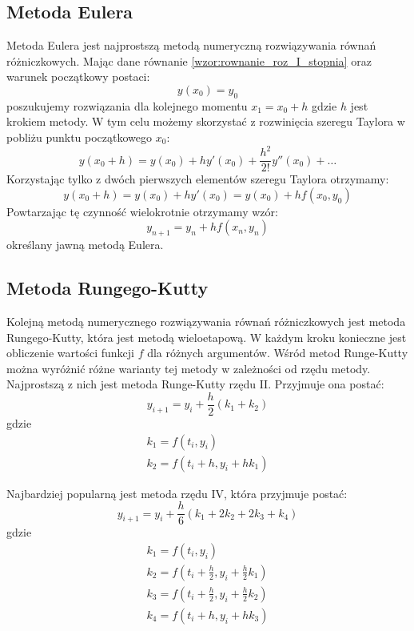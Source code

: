 \subsection*{Metoda Eulera}
Metoda Eulera jest najprostszą metodą numeryczną rozwiązywania równań różniczkowych. Mając dane równanie \ref{wzor:rownanie_roz_I_stopnia} oraz warunek początkowy postaci:
\begin{equation}
	y(x_0) = y_0	
\end{equation}
poszukujemy rozwiązania dla kolejnego momentu $x_1 = x_0 + h$ gdzie $h$ jest krokiem metody. W tym celu możemy skorzystać z rozwinięcia szeregu Taylora w pobliżu punktu początkowego $x_0$:
\begin{equation}
	y(x_0 + h) = y(x_0) + hy'(x_0) + \frac{h^2}{2!}y''(x_0) + \hdots
\end{equation}
Korzystając tylko z dwóch pierwszych elementów szeregu Taylora otrzymamy:
\begin{equation}
	y(x_0 + h) = y(x_0) + hy'(x_0) = y(x_0) + hf(x_0,y_0)
\end{equation}
Powtarzając tę czynność wielokrotnie otrzymamy wzór:
\begin{equation}
	y_{n+1} = y_{n} + hf(x_n,y_n)
\end{equation}
określany jawną metodą Eulera.

\subsection*{Metoda Rungego-Kutty}
Kolejną metodą numerycznego rozwiązywania równań różniczkowych jest metoda \mbox{Rungego-Kutty}, która jest metodą wieloetapową. W każdym kroku konieczne jest obliczenie wartości funkcji $f$ dla różnych argumentów. Wśród metod Runge-Kutty można wyróżnić różne warianty tej metody w zależności od rzędu metody. Najprostszą z nich jest metoda Runge-Kutty rzędu II. Przyjmuje ona postać:
\begin{equation}
	y_{i+1} = y_i + \frac{h}{2}(k_1 + k_2)
\end{equation}
gdzie
$$\begin{array}{c}
	k_1 = f(t_i,y_i) \\
	k_2 = f(t_i + h, y_i + hk_1)
\end{array}$$

Najbardziej popularną jest metoda rzędu IV, która przyjmuje postać:
\begin{equation}
	y_{i+1} = y_i + \frac{h}{6}(k_1 + 2k_2 + 2k_3 + k_4)
\end{equation}
gdzie
$$\begin{array}{c}
	k_1 = f(t_i,y_i) \\
	k_2 = f(t_i + \frac{h}{2}, y_i + \frac{h}{2}k_1) \\
	k_3 = f(t_i + \frac{h}{2}, y_i + \frac{h}{2}k_2) \\
	k_4 = f(t_i + h,y_i + hk_3) \\
\end{array}$$

